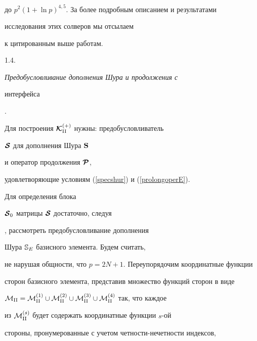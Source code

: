 до $p^2(1+\ln p)^{4{,}5}$. За более подробным описанием и результатами 


исследования этих солверов мы отсылаем


к цитированным выше работам.


\medskip





1.4. {\it Предобусловливание дополнения Шура и продолжения с


интерфейса}. \label{PSPR}


Для построения $\boldsymbol {\cal K}_{{\mathrm{II}}}^{(+)}$ нужны: предобусловливатель


$\boldsymbol {\cal S}$ для дополнения Шура ${\bold S}$


и оператор продолжения $\boldsymbol {\cal P}$,


удовлетворяющие условиям (\ref{specshur}) и (\ref{prolongoperE}).


Для определения блока


$\boldsymbol {\cal S}_0$ матрицы $\boldsymbol {\cal S}$ достаточно, следуя


\cite{KJ1997}, рассмотреть предобусловливание дополнения 


Шура $\Bbb{ S}_{E}$ базисного элемента. Будем считать, 


не нарушая общности, что $p=2N+1$. Переупорядочим координатные функции 


сторон базисного элемента, представив множество функций сторон в виде


${\cal M}_{\rii}={\cal M}^{(1)}_{\rii}\cup {\cal M}^{(2)}_{\rii}


\cup {\cal M}^{(3)}_{\rii}\cup {\cal M}^{(4)}_{\rii}$ так, что каждое 


из ${\cal M}^{(s)}_{{\mathrm{II}}}$ будет содержать координатные функции $s$-ой 


стороны, пронумерованные с учетом четности-нечетности индексов,



